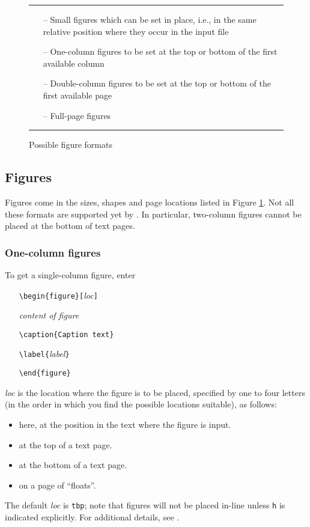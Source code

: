 \begin{figure}[t,b]
\hrule
\begin{itemize}
\item[--] Small figures which can be set in place, i.e., in the same
        relative position where they occur in the input file
\item[--] One-column figures to be set at the top or bottom of the
        first available column
\item[--] Double-column figures to be set at the top or bottom of the
        first available page
\item[--] Full-page figures
\end{itemize}
\vspace{-.5\baselineskip}
\caption[figtype]{Possible figure formats}
\vspace{.5\baselineskip}
\hrule
\label{figtype}
\end{figure}

\subsection{Figures}

Figures come in the sizes, shapes and page locations listed in
Figure \ref{figtype}.  Not all these formats are supported yet by \DP\@.
In particular, two-column figures cannot be placed at the
bottom of text pages.

\subsubsection{One-column figures}

To get a single-column figure, enter
\begin{itemize} \parskip=0pt \itemsep=0pt
\item[] \verb"\begin{figure}["{\it loc\/}\verb"]"
\item[] {\it content of figure}
\item[] \verb"\caption{Caption text}"
\item[] \verb"\label{"{\it label\/}\verb"}"
\item[] \verb"\end{figure}"
\end{itemize}
\par\noindent
{\it loc\/} is the location where the figure is to be placed, specified
by one to four letters (in the order in which you find the possible
locations suitable), as follows:
\begin{itemize}
\item[\verb"h"] here, at the position in the text where the figure is input.
\item[\verb"t"] at the top of a text page.
\item[\verb"b"] at the bottom of a text page.
\item[\verb"p"] on a page of ``floats''.
\end{itemize}
\par\noindent
The default {\it loc\/} is \verb"tbp"; note that figures will not be
placed in-line unless \verb"h" is indicated explicitly.  For
additional details, see \cite{LT}.

